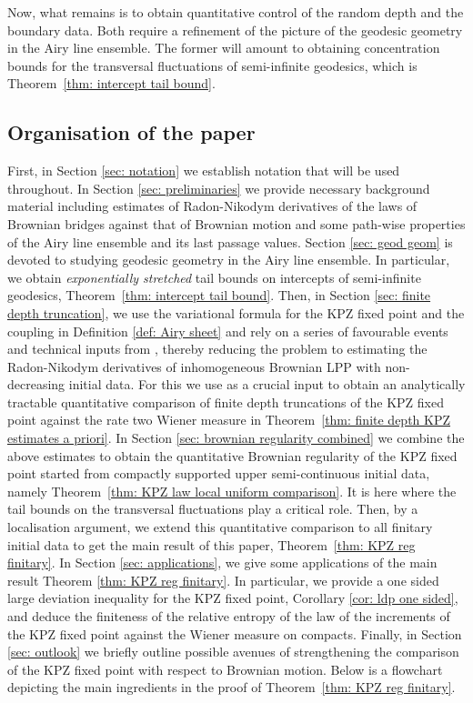 \documentclass[11pt, reqno]{amsart}
\numberwithin{equation}{section}
\begin{document}
Now, what remains is to obtain quantitative control of the random depth and the boundary data. Both require a refinement of the picture of the geodesic geometry in the Airy line ensemble. The former will amount to obtaining concentration bounds for the transversal fluctuations of semi-infinite geodesics, which is Theorem~\ref{thm: intercept tail bound}. 

\subsection{Organisation of the paper}
First, in Section \ref{sec: notation} we establish notation that will be used throughout. In Section \ref{sec: preliminaries} we provide necessary background material including estimates of Radon-Nikodym derivatives of the laws of Brownian bridges against that of Brownian motion and some path-wise properties of the Airy line ensemble and its last passage values. Section \ref{sec: geod geom} is devoted to studying geodesic geometry in the Airy line ensemble. In particular, we obtain \emph{exponentially stretched} tail bounds on intercepts of semi-infinite geodesics, Theorem~\ref{thm: intercept tail bound}. Then, in Section \ref{sec: finite depth truncation}, we use the variational formula for the KPZ fixed point and the coupling in Definition \ref{def: Airy sheet} and rely on a series of favourable events and technical inputs from \cite{wu2025applicationsoptimaltransportdyson}, thereby reducing the problem to estimating the Radon-Nikodym derivatives of inhomogeneous Brownian LPP with non-decreasing initial data. For this we use \cite[Theorem~7.1]{tassopoulos2025inhomogeneousbrownian} as a crucial input to obtain an analytically tractable quantitative comparison of finite depth truncations of the KPZ fixed point against the rate two Wiener measure in Theorem~\ref{thm: finite depth KPZ estimates a priori}. In Section \ref{sec: brownian regularity combined} we combine the above estimates to obtain the quantitative Brownian regularity of the KPZ fixed point started from compactly supported upper semi-continuous initial data, namely Theorem~\ref{thm: KPZ law local uniform comparison}. It is here where the tail bounds on the transversal fluctuations play a critical role. Then, by a localisation argument, we extend this quantitative comparison to all finitary initial data to get the main result of this paper, Theorem~\ref{thm: KPZ reg finitary}. In Section \ref{sec: applications}, we give some applications of the main result Theorem \ref{thm: KPZ reg finitary}. In particular,  we provide a one sided large deviation inequality for the KPZ fixed point, Corollary \ref{cor: ldp one sided}, and deduce the finiteness of the relative entropy of the law of the increments of the KPZ fixed point against the Wiener measure on compacts. Finally, in Section \ref{sec: outlook} we briefly outline possible avenues of strengthening the comparison of the KPZ fixed point with respect to Brownian motion. Below is a flowchart depicting the main ingredients in the proof of Theorem~\ref{thm: KPZ reg finitary}.
\end{document}
